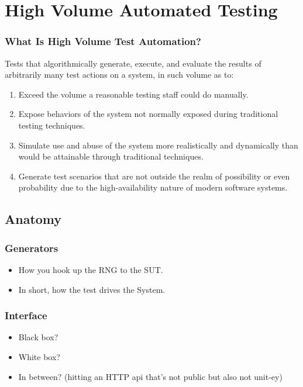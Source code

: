 \section{High Volume Automated Testing}

\begin{frame}
  \frametitle{What Is High Volume Test Automation?}
  Tests that algorithmically generate, execute, and evaluate the results of arbitrarily many test actions on a system, in such volume as to:\citep{KanerHivatOverview}
  \begin{enumerate}
  \item Exceed the volume a reasonable testing staff could do manually.
  \item Expose behaviors of the system not normally exposed during traditional testing techniques.
  \item Simulate use and abuse of the system more realistically and dynamically than would be attainable through traditional techniques.
  \item Generate test scenarios that are not outside the realm of possibility or even probability due to the high-availability nature of modern software systems.
\end{enumerate}
\end{frame}

\subsection{Anatomy}

\begin{frame}
  \frametitle{Generators}
  \begin{itemize}
    \item How you hook up the RNG to the SUT.
    \item In short, how the test drives the System.
  \end{itemize}
\end{frame}

\begin{frame}
  \frametitle{Interface}
  \begin{itemize}
    \item Black box?
    \item White box?
    \item In between? (hitting an HTTP api that's not public but also not unit-ey)
  \end{itemize}
\end{frame}

